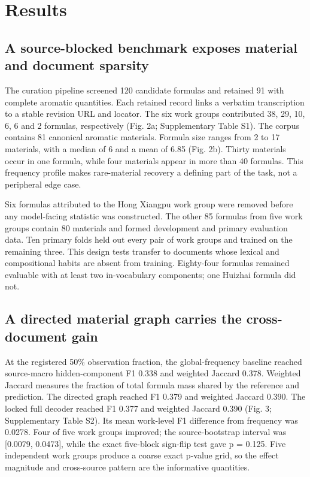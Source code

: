 \documentclass[12pt]{article}
\begin{document}
\section*{Results}

\subsection*{A source-blocked benchmark exposes material and document sparsity}

The curation pipeline screened 120 candidate formulas and retained 91 with complete aromatic quantities. Each retained record links a verbatim transcription to a stable revision URL and locator. The six work groups contributed 38, 29, 10, 6, 6 and 2 formulas, respectively (Fig. 2a; Supplementary Table S1). The corpus contains 81 canonical aromatic materials. Formula size ranges from 2 to 17 materials, with a median of 6 and a mean of 6.85 (Fig. 2b). Thirty materials occur in one formula, while four materials appear in more than 40 formulas. This frequency profile makes rare-material recovery a defining part of the task, not a peripheral edge case.

Six formulas attributed to the Hong Xiangpu work group were removed before any model-facing statistic was constructed. The other 85 formulas from five work groups contain 80 materials and formed development and primary evaluation data. Ten primary folds held out every pair of work groups and trained on the remaining three. This design tests transfer to documents whose lexical and compositional habits are absent from training. Eighty-four formulas remained evaluable with at least two in-vocabulary components; one Huizhai formula did not.

\subsection*{A directed material graph carries the cross-document gain}

At the registered 50\% observation fraction, the global-frequency baseline reached source-macro hidden-component F1 0.338 and weighted Jaccard 0.378. Weighted Jaccard measures the fraction of total formula mass shared by the reference and prediction. The directed graph reached F1 0.379 and weighted Jaccard 0.390. The locked full decoder reached F1 0.377 and weighted Jaccard 0.390 (Fig. 3; Supplementary Table S2). Its mean work-level F1 difference from frequency was 0.0278. Four of five work groups improved; the source-bootstrap interval was [0.0079, 0.0473], while the exact five-block sign-flip test gave p = 0.125. Five independent work groups produce a coarse exact p-value grid, so the effect magnitude and cross-source pattern are the informative quantities.
\end{document}
